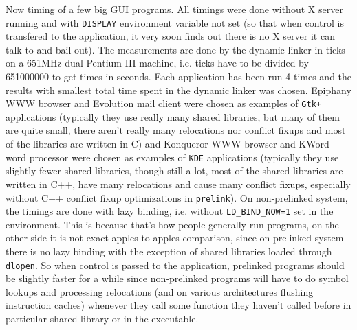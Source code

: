 \documentclass[twoside]{article}
\def\tts#1{\texttt{\small #1}}
\begin{document}
Now timing of a few big GUI programs.  All timings were done without X
server running and with \tts{DISPLAY} environment variable not set
(so that when control is transfered to the application, it very soon
finds out there is no X server it can talk to and bail out).  The
measurements are done by the dynamic linker in ticks on a 651MHz
dual Pentium III machine, i.e. ticks have to be divided by 651000000
to get times in seconds.  Each application has been run 4 times
and the results with smallest total time spent in the dynamic
linker was chosen.  Epiphany WWW browser and Evolution mail client
were chosen as examples of \tts{Gtk+} applications (typically they use
really many shared libraries, but many of them are quite small,
there aren't really many relocations nor conflict fixups and most
of the libraries are written in C) and Konqueror WWW browser and
KWord word processor were chosen as examples of \tts{KDE} applications
(typically they use slightly fewer shared libraries, though
still a lot, most of the shared libraries are written in C++,
have many relocations and cause many conflict fixups, especially
without C++ conflict fixup optimizations in \tts{prelink}).
On non-prelinked system, the timings are done with lazy binding,
i.e. without \tts{LD\_BIND\_NOW=1} set in the environment.
This is because that's how people generally run programs, on the other
side it is not exact apples to apples comparison, since on prelinked
system there is no lazy binding with the exception of shared libraries
loaded through \tts{dlopen}.  So when control is passed to the application,
prelinked programs should be slightly faster for a while since non-prelinked
programs will have to do symbol lookups and processing relocations
(and on various architectures flushing instruction caches) whenever
they call some function they haven't called before in particular shared
library or in the executable.
\end{document}
